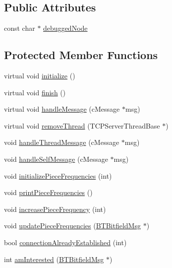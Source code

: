 \subsection*{Public Attributes}
\begin{DoxyCompactItemize}
\item 
const char $\ast$ \hyperlink{classBTPeerWireBase_aba05b9c96ed2ca76bc5f6716906ac375}{debugged\+Node}
\end{DoxyCompactItemize}
\subsection*{Protected Member Functions}
\begin{DoxyCompactItemize}
\item 
virtual void \hyperlink{classBTPeerWireBase_a3dbfbfe574e394cf5ea2abd7481af0a7}{initialize} ()
\item 
virtual void \hyperlink{classBTPeerWireBase_a152e039e8e6238e3eced4394ef3328c4}{finish} ()
\item 
virtual void \hyperlink{classBTPeerWireBase_ac80ef62532bb46794a803a551bb42cf1}{handle\+Message} (c\+Message $\ast$msg)
\item 
virtual void \hyperlink{classBTPeerWireBase_a1bf13893f9fdfd12314717cd4f6d5b6f}{remove\+Thread} (T\+C\+P\+Server\+Thread\+Base $\ast$)
\item 
void \hyperlink{classBTPeerWireBase_a55736edb35150638f52c67333bd2122c}{handle\+Thread\+Message} (c\+Message $\ast$msg)
\item 
void \hyperlink{classBTPeerWireBase_af98aff965846c4f22da03df26f308e66}{handle\+Self\+Message} (c\+Message $\ast$msg)
\item 
void \hyperlink{classBTPeerWireBase_ad8a73e47f71d79833b118031872f9a66}{initialize\+Piece\+Frequencies} (int)
\item 
void \hyperlink{classBTPeerWireBase_aad05e4c7433361e16f81f0a7546b7071}{print\+Piece\+Frequencies} ()
\item 
void \hyperlink{classBTPeerWireBase_a2729ff7330ec1d914abc25dfa8823a2f}{increase\+Piece\+Frequency} (int)
\item 
void \hyperlink{classBTPeerWireBase_ab9d11bec8560f32ff67dd21b6f5f0759}{update\+Piece\+Frequencies} (\hyperlink{classBTBitfieldMsg}{B\+T\+Bitfield\+Msg} $\ast$)
\item 
bool \hyperlink{classBTPeerWireBase_a15b4bc3902d8dd1de64353b0a23b5cc1}{connection\+Already\+Established} (int)
\item 
int \hyperlink{classBTPeerWireBase_a8b610462b59f94fe47c5bec21ec5f18d}{am\+Interested} (\hyperlink{classBTBitfieldMsg}{B\+T\+Bitfield\+Msg} $\ast$)

\end{DoxyCompactItemize}
